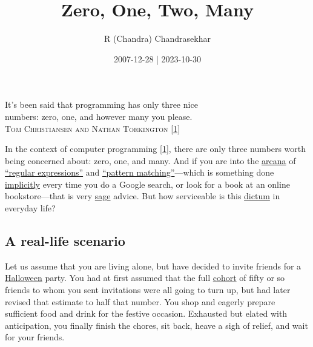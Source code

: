 \documentclass[
  a4paper,
]{article}
\title{Zero, One, Two, Many}
\author{R (Chandra) Chandrasekhar}
\date{2007-12-28 | 2023-10-30}
\begin{document}
\maketitle

\thispagestyle{empty}


\begin{flushright}

\begin{footnotesize}

It's been said that programming has only three nice\\
numbers: zero, one, and however many you please.\\
\textsc{Tom Christiansen and Nathan Torkington}
{[}\protect\hyperlink{ref-perlcookbook2003}{1}{]}

\end{footnotesize}

\end{flushright}

\hfill\break
In the context of computer programming
{[}\protect\hyperlink{ref-perlcookbook2003}{1}{]}, there are only three
numbers worth being concerned about: zero, one, and many. And if you are
into the \href{https://en.wiktionary.org/wiki/arcana}{arcana} of
\href{https://developer.mozilla.org/en-US/docs/Web/JavaScript/Guide/Regular_expressions}{``regular
expressions''} and
\href{https://www.google.com/search?q=pattern+matching}{``pattern
matching''}---which is something done
\href{https://www.dictionary.com/browse/implicitly}{implicitly} every
time you do a Google search, or look for a book at an online
bookstore---that is very
\href{https://www.merriam-webster.com/dictionary/sage}{sage} advice. But
how serviceable is this
\href{https://www.dictionary.com/browse/dictum}{dictum} in everyday
life?

\hypertarget{a-real-life-scenario}{%
\subsection{A real-life scenario}\label{a-real-life-scenario}}

Let us assume that you are living alone, but have decided to invite
friends for a
\href{https://www.britannica.com/topic/Halloween}{Halloween} party. You
had at first assumed that the full
\href{https://www.vocabulary.com/dictionary/cohort}{cohort} of fifty or
so friends to whom you sent invitations were all going to turn up, but
had later revised that estimate to half that number. You shop and
eagerly prepare sufficient food and drink for the festive occasion.
Exhausted but elated with anticipation, you finally finish the chores,
sit back, heave a sigh of relief, and wait for your friends.
\end{document}
